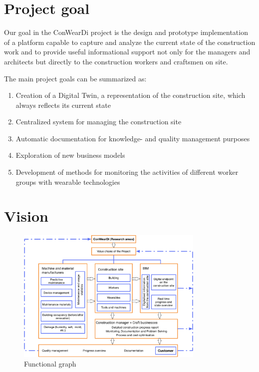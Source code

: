 \section{Project goal}
Our goal in the ConWearDi project is the design and prototype implementation of a platform capable to capture and analyze the current state of the construction work and to provide useful informational support not only for the managers and architects but directly to the construction workers and craftsmen on site. 


The main project goals can be summarized as:
\begin{enumerate}
  \item Creation of a Digital Twin, a representation of the construction site, which always reflects its current state 
  \item Centralized system for managing the construction site
  \item Automatic documentation for knowledge- and quality management purposes
  \item Exploration of new business models
  \item Development of methods for monitoring the activities of different worker groups with wearable technologies
\end{enumerate}

\section{Vision}

\begin{figure}[htp]
\includegraphics[width=0.8\textwidth]{figures/conweardi-functional}
\caption{Functional graph}
\label{fig:functional}
\end{figure}


